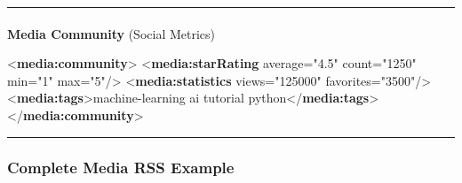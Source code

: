 \documentclass[
  letterpaper,
  DIV=11,
  numbers=noendperiod]{scrartcl}
\makeatletter
\let\oldparagraph\paragraph
\renewcommand{\paragraph}{
    \@ifstar
      \xxxParagraphStar
      \xxxParagraphNoStar
  }
\newcommand{\xxxParagraphStar}[1]{\oldparagraph*{#1}\mbox{}}
\newcommand{\xxxParagraphNoStar}[1]{\oldparagraph{#1}\mbox{}}
\newenvironment{Shaded}{\begin{snugshade}}{\end{snugshade}}
\newcommand{\KeywordTok}[1]{\textcolor[rgb]{0.00,0.23,0.31}{\textbf{#1}}}
\newcommand{\NormalTok}[1]{\textcolor[rgb]{0.00,0.23,0.31}{#1}}
\newcommand{\OtherTok}[1]{\textcolor[rgb]{0.00,0.23,0.31}{#1}}
\newcommand{\StringTok}[1]{\textcolor[rgb]{0.13,0.47,0.30}{#1}}
\makeatother
\begin{document}
\begin{center}\rule{0.5\linewidth}{0.5pt}\end{center}

\paragraph{\texorpdfstring{\textbf{Media Community} (Social
Metrics)}{Media Community (Social Metrics)}}\label{media-community-social-metrics}

\begin{Shaded}
\begin{Highlighting}[]
\NormalTok{\textless{}}\KeywordTok{media:community}\NormalTok{\textgreater{}}
\NormalTok{  \textless{}}\KeywordTok{media:starRating}\OtherTok{ average=}\StringTok{"4.5"}\OtherTok{ count=}\StringTok{"1250"}\OtherTok{ min=}\StringTok{"1"}\OtherTok{ max=}\StringTok{"5"}\NormalTok{/\textgreater{}}
\NormalTok{  \textless{}}\KeywordTok{media:statistics}\OtherTok{ views=}\StringTok{"125000"}\OtherTok{ favorites=}\StringTok{"3500"}\NormalTok{/\textgreater{}}
\NormalTok{  \textless{}}\KeywordTok{media:tags}\NormalTok{\textgreater{}machine{-}learning ai tutorial python\textless{}/}\KeywordTok{media:tags}\NormalTok{\textgreater{}}
\NormalTok{\textless{}/}\KeywordTok{media:community}\NormalTok{\textgreater{}}
\end{Highlighting}
\end{Shaded}

\begin{center}\rule{0.5\linewidth}{0.5pt}\end{center}

\subsubsection{Complete Media RSS
Example}\label{complete-media-rss-example}
\end{document}
